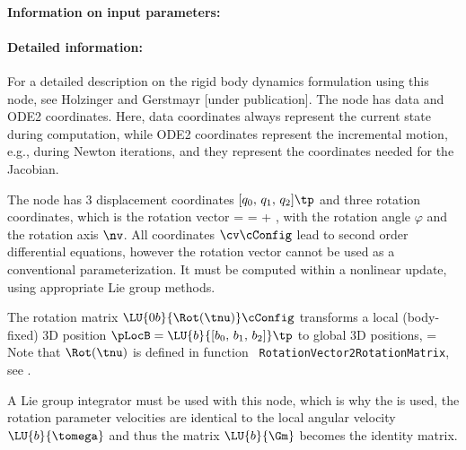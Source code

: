 \paragraph{Information on input parameters:} 
\finishTable
 \noindent
    \paragraph{Detailed information:}
    For a detailed description on the rigid body dynamics formulation using this node, see Holzinger and Gerstmayr [under publication].
    The node has data and ODE2 coordinates. Here, data coordinates always represent the current state during computation, while
    ODE2 coordinates represent the incremental motion, e.g., during Newton iterations, and they represent the 
    coordinates needed for the Jacobian.

    The node has 3 displacement coordinates $[q_0,\,q_1,\,q_2]\tp$ and three rotation coordinates, which is the rotation vector 
    \be
      \tnu = \varphi \nv = \tnu\cConfig + \tnu\cRef,
    \ee
    with the rotation angle $\varphi$ and the rotation axis $\nv$.
    All coordinates $\cv\cConfig$ lead to second order differential equations, however the rotation vector cannot be used as a conventional parameterization. It must be computed within a nonlinear update, using appropriate Lie group methods.

    The rotation matrix $\LU{0b}{\Rot(\tnu)}\cConfig$ transforms a local (body-fixed) 3D position 
    $\pLocB = \LU{b}{[b_0,\,b_1,\,b_2]}\tp$ to global 3D positions,
    \be
      \cConfig = \cConfig {} 
    \ee
    Note that $\Rot(\tnu)$ is defined in function \texttt{ RotationVector2RotationMatrix}, see .
    
    A Lie group integrator must be used with this node, which is why the is used, the 
    rotation parameter velocities are identical to the local angular velocity $\LU{b}{\tomega}$ and thus the 
    matrix $ \LU{b}{\Gm}$ becomes the identity matrix.
    
